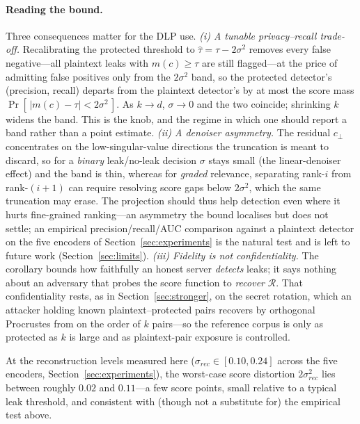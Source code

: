 \documentclass[11pt,a4paper]{article}
\begin{document}
\paragraph{Reading the bound.} Three consequences matter for the DLP use.
\emph{(i) A tunable privacy--recall trade-off.} Recalibrating the
protected threshold to $\hat\tau=\tau-2\sigma^{2}$ removes every false
negative---all plaintext leaks with $m(c)\ge\tau$ are still flagged---at
the price of admitting false positives only from the $2\sigma^{2}$ band,
so the protected detector's (precision, recall) departs from the
plaintext detector's by at most the score mass
$\Pr[\,|m(c)-\tau|<2\sigma^{2}\,]$. As $k\to d$, $\sigma\to0$ and the two
coincide; shrinking $k$ widens the band. This is the knob, and the regime
in which one should report a band rather than a point estimate.
\emph{(ii) A denoiser asymmetry.} The residual $c_\perp$ concentrates on
the low-singular-value directions the truncation is meant to discard, so
for a \emph{binary} leak/no-leak decision $\sigma$ stays small (the
linear-denoiser effect) and the band is thin, whereas for \emph{graded}
relevance, separating rank-$i$ from rank-$(i{+}1)$ can require resolving
score gaps below $2\sigma^{2}$, which the same truncation may erase. The
projection should thus help detection even where it hurts fine-grained
ranking---an asymmetry the bound localises but does not settle; an
empirical precision/recall/AUC comparison against a plaintext detector on
the five encoders of Section~\ref{sec:experiments} is the natural test
and is left to future work (Section~\ref{sec:limits}).
\emph{(iii) Fidelity is not confidentiality.} The corollary bounds how
faithfully an honest server \emph{detects} leaks; it says nothing about
an adversary that probes the score function to \emph{recover}
$\mathcal{R}$. That confidentiality rests, as in
Section~\ref{sec:stronger}, on the secret rotation, which an attacker
holding known plaintext--protected pairs recovers by orthogonal
Procrustes from on the order of $k$ pairs---so the reference corpus is
only as protected as $k$ is large and as plaintext-pair exposure is
controlled.

At the reconstruction levels measured here
($\sigma_{rec}\in[0.10,0.24]$ across the five encoders,
Section~\ref{sec:experiments}), the worst-case score distortion
$2\sigma_{rec}^{2}$ lies between roughly $0.02$ and $0.11$---a few score
points, small relative to a typical leak threshold, and consistent with
(though not a substitute for) the empirical test above.

\end{document}
